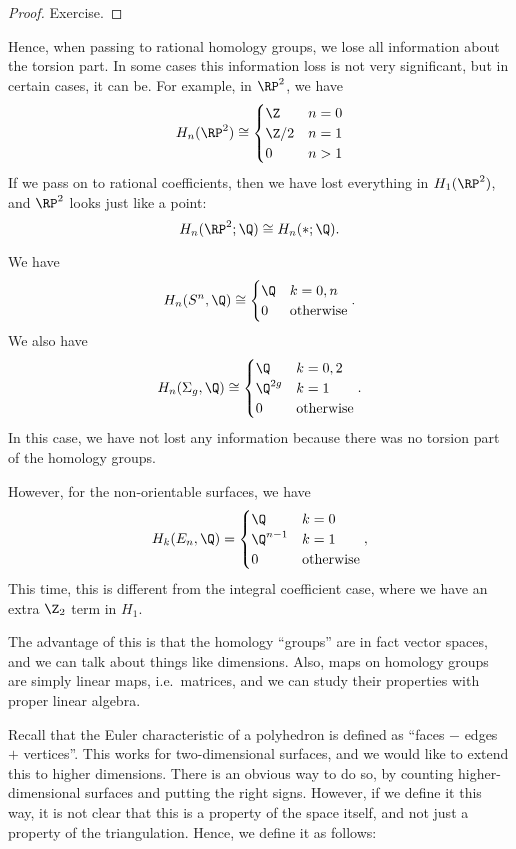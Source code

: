 \documentclass[a4paper]{article}
\begin{document}
\begin{proof}
  Exercise. %
\end{proof}
Hence, when passing to rational homology groups, we lose all information about the torsion part. In some cases this information loss is not very significant, but in certain cases, it can be. For example, in $\RP^2$, we have
\[
  H_n(\RP^2) \cong
  \begin{cases}
    \Z & n = 0\\
    \Z/2 & n = 1\\
    0 & n > 1
  \end{cases}
\]
If we pass on to rational coefficients, then we have lost everything in $H_1(\RP^2)$, and $\RP^2$ looks just like a point:
\[
  H_n(\RP^2; \Q) \cong H_n(*; \Q).
\]
\begin{eg}
  We have
  \[
    H_n(S^n, \Q) \cong
    \begin{cases}
      \Q & k = 0, n\\
      0 & \text{otherwise}
    \end{cases}.
  \]
  We also have
  \[
    H_n(\Sigma_g, \Q) \cong
    \begin{cases}
      \Q & k = 0, 2\\
      \Q^{2g} & k = 1\\
      0 & \text{otherwise}
    \end{cases}.
  \]
  In this case, we have not lost any information because there was no torsion part of the homology groups.

  However, for the non-orientable surfaces, we have
  \[
    H_k(E_n, \Q) =
    \begin{cases}
      \Q & k = 0\\
      \Q^{n - 1} & k = 1\\
      0 & \text{otherwise}
    \end{cases},
  \]
  This time, this is different from the integral coefficient case, where we have an extra $\Z_2$ term in $H_1$.
\end{eg}

The advantage of this is that the homology ``groups'' are in fact vector spaces, and we can talk about things like dimensions. Also, maps on homology groups are simply linear maps, i.e.\ matrices, and we can study their properties with proper linear algebra.

Recall that the Euler characteristic of a polyhedron is defined as ``faces $-$ edges $+$ vertices''. This works for two-dimensional surfaces, and we would like to extend this to higher dimensions. There is an obvious way to do so, by counting higher-dimensional surfaces and putting the right signs. However, if we define it this way, it is not clear that this is a property of the space itself, and not just a property of the triangulation. Hence, we define it as follows:
\end{document}
